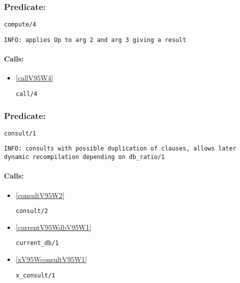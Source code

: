 \subsubsection{Predicate:} \label{computeV95W4}

\begin{verbatim}
compute/4
\end{verbatim}

{\small \begin{verbatim}
INFO: applies Op to arg 2 and arg 3 giving a result

\end{verbatim}}
\paragraph{Calls:} 
\begin{itemize}
\item \ref{callV95W4} 
\begin{verbatim}
call/4
\end{verbatim}

\end{itemize}

\subsubsection{Predicate:} \label{consultV95W1}

\begin{verbatim}
consult/1
\end{verbatim}

{\small \begin{verbatim}
INFO: consults with possible duplication of clauses, allows later dynamic recompilation depending on db_ratio/1

\end{verbatim}}
\paragraph{Calls:} 
\begin{itemize}
\item \ref{consultV95W2} 
\begin{verbatim}
consult/2
\end{verbatim}

\item \ref{currentV95WdbV95W1} 
\begin{verbatim}
current_db/1
\end{verbatim}

\item \ref{xV95WconsultV95W1} 
\begin{verbatim}
x_consult/1
\end{verbatim}

\end{itemize}
